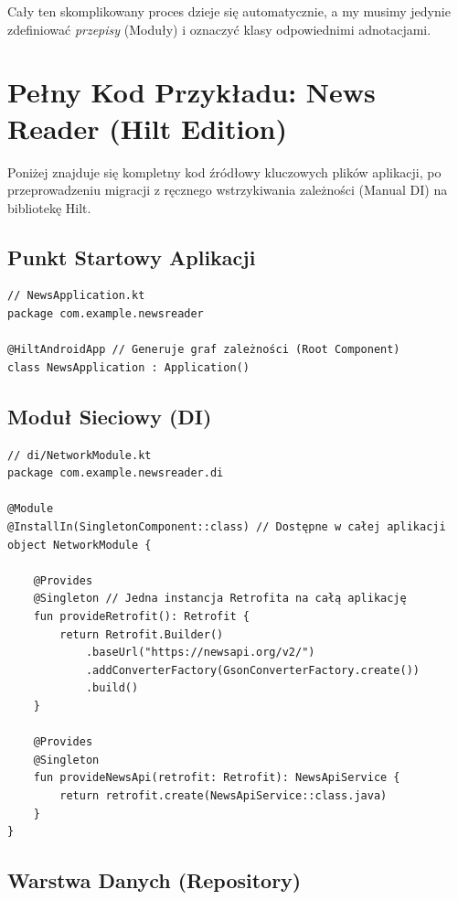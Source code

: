 Cały ten skomplikowany proces dzieje się automatycznie, a my musimy jedynie zdefiniować \textit{przepisy} (Moduły) i oznaczyć klasy odpowiednimi adnotacjami.

\section{Pełny Kod Przykładu: News Reader (Hilt Edition)}

Poniżej znajduje się kompletny kod źródłowy kluczowych plików aplikacji, po przeprowadzeniu migracji z ręcznego wstrzykiwania zależności (Manual DI) na bibliotekę Hilt.

\subsection{Punkt Startowy Aplikacji}

\begin{verbatim}
// NewsApplication.kt
package com.example.newsreader

@HiltAndroidApp // Generuje graf zależności (Root Component)
class NewsApplication : Application()
\end{verbatim}

\subsection{Moduł Sieciowy (DI)}

\begin{verbatim}
// di/NetworkModule.kt
package com.example.newsreader.di

@Module
@InstallIn(SingletonComponent::class) // Dostępne w całej aplikacji
object NetworkModule {

    @Provides
    @Singleton // Jedna instancja Retrofita na całą aplikację
    fun provideRetrofit(): Retrofit {
        return Retrofit.Builder()
            .baseUrl("https://newsapi.org/v2/")
            .addConverterFactory(GsonConverterFactory.create())
            .build()
    }

    @Provides
    @Singleton
    fun provideNewsApi(retrofit: Retrofit): NewsApiService {
        return retrofit.create(NewsApiService::class.java)
    }
}
\end{verbatim}

\subsection{Warstwa Danych (Repository)}

